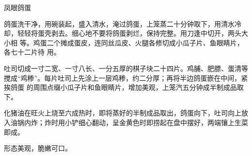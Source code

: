 %
%
%
%
%
%
%
\begin{recipe}{凤眼鸽蛋}

\ingredients


\preparation

\step 鸽蛋洗干净，用碗装起，盛入清水，淹过鸽蛋，上笼蒸二十分钟取下，用清水冷
却，轻轻将蛋壳剥去。细心地不要将鸽蛋剥烂，保持完整。用刀逢中切开，两头大小相
等。鸡蛋二个摊成蛋皮，连同丝瓜皮、火腿各修切成小瓜子片、鱼眼睛片，各七十二片待
用。

\step 吐司切成一寸二宽、一寸八长、一分五厚的棋子块二十四片。鸡脯、肥膘、蛋清等
搅成“鸡糁”。每片吐司上先涂上一层鸡糁，约二分厚；再将半边鸽蛋嵌在中间，紧挨鸽蛋
的周围点缀小瓜子片和鱼眼睛片，增加美观，上笼汽五分钟成半制成品取下。

\step 化猪油在旺火上烧至六成热时，即将蒸好的半制成品取出，鸽蛋向下，吐司向上放
入油锅内炸；炸时用小铲细心翻动，呈金黄色时即捞起在盘中摆好，两端镶上生菜即成。

\features

形态美观，脆嫩可口。

\end{recipe}

